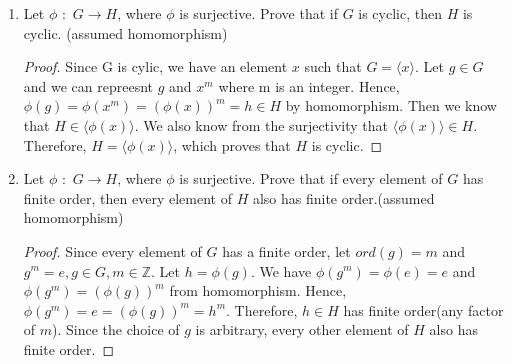 \documentclass[12pt]{article}
\newcommand{\Z}{\mathbb{Z}}
\begin{document}
\begin{enumerate}
\begin{proof}
			Then, let $g \in G$ and $a \in H \cap K$. We know that $gag^{-1} \in H$ because $H$ is a normal subgroup. Similarly, $gag^{-1} \in K$. Hence, 	$gag^{-1} \in H \cap K$.
		
			Therefore, we can conclude that any intersection of normal subgroups of $G$ is itself a normal subgroup of $G$.
		
	\end{proof}
		
		
		
		
		
		\item Let $\phi$ $:$ $G\rightarrow H$, where $\phi$ is surjective. Prove that if $G$ is cyclic, then $H$ is cyclic. (assumed homomorphism)
		
		
		\begin{proof}
			Since G is cylic, we have an element $x$ such that $G= \langle x \rangle$. Let $g \in G$ and we can repreesnt $g$ and $x^m$ where m is an integer. Hence, $\phi(g) =  \phi (x^m) = (\phi(x))^m = h \in H$ by homomorphism. Then we know that $H \in  \langle  \phi(x)\rangle$. We also know from the surjectivity that $ \langle\phi(x)\rangle \in H$. Therefore, $H =   \langle \phi(x)\rangle$, which proves that $H$ is cyclic.
			
			\end{proof}
		
		
		
		\item Let $\phi$ $:$ $G\rightarrow H$, where $\phi$ is surjective. Prove that if every element of $G$ has finite order, then every element of $H$ also has finite order.(assumed homomorphism)
		\begin{proof}
			
				Since every element of $G$ has a finite order, let $ord(g) = m$ and $g^m = e, g \in G, m \in \Z$. Let $h = \phi (g)$. We have $\phi(g^m) = \phi(e) = e$ and $\phi(g^m) =(\phi(g))^m$ from homomorphism. Hence, $\phi(g^m) = e = (\phi(g))^m = h^m$. Therefore, $h \in H$ has finite order(any factor of $m$). Since the choice of $g$ is arbitrary, every other element of $H$ also has finite order.
			
		\end{proof}
		
	\end{enumerate}
\end{document}
